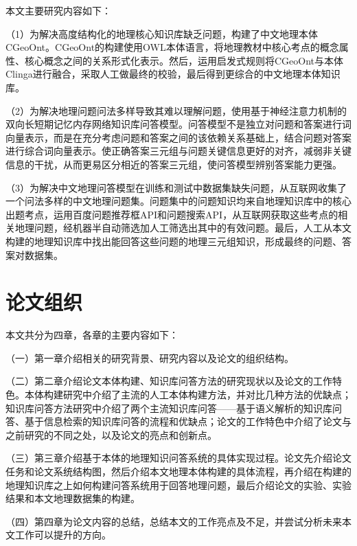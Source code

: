 本文主要研究内容如下：

（1）为解决高度结构化的地理核心知识库缺乏问题，构建了中文地理本体CGeoOnt。CGeoOnt的构建使用OWL本体语言，将地理教材中核心考点的概念属性、核心概念之间的关系形式化表示。然后，运用启发式规则将CGeoOnt与本体Clinga进行融合，采取人工做最终的校验，最后得到更综合的中文地理本体知识库。

（2）为解决地理问题问法多样导致其难以理解问题，使用基于神经注意力机制的双向长短期记忆内存网络知识库问答模型。问答模型不是独立对问题和答案进行词向量表示，而是在充分考虑问题和答案之间的该依赖关系基础上，结合问题对答案进行综合词向量表示。使正确答案三元组与问题关键信息更好的对齐，减弱非关键信息的干扰，从而更易区分相近的答案三元组，使问答模型辨别答案能力更强。

（3）为解决中文地理问答模型在训练和测试中数据集缺失问题，从互联网收集了一个问法多样的中文地理问题集。问题集中的问题知识均来自地理知识库中的核心出题考点，运用百度问题推荐框API和问题搜索API，从互联网获取这些考点的相关地理问题，经机器半自动筛选加人工筛选出其中的有效问题。最后，人工从本文构建的地理知识库中找出能回答这些问题的地理三元组知识，形成最终的问题、答案对数据集。

\section{论文组织}
本文共分为四章，各章的主要内容如下：

（一）第一章介绍相关的研究背景、研究内容以及论文的组织结构。

（二）第二章介绍论文本体构建、知识库问答方法的研究现状以及论文的工作特色。本体构建研究中介绍了主流的人工本体构建方法，并对比几种方法的优缺点；知识库问答方法研究中介绍了两个主流知识库问答——基于语义解析的知识库问答、基于信息检索的知识库问答的流程和优缺点；论文的工作特色中介绍了论文与之前研究的不同之处，以及论文的亮点和创新点。

（三）第三章介绍基于本体的地理知识问答系统的具体实现过程。论文先介绍论文任务和论文系统结构图，然后介绍本文地理本体构建的具体流程，再介绍在构建的地理知识库之上如何构建问答系统用于回答地理问题，最后介绍论文的实验、实验结果和本文地理数据集的构建。

（四）第四章为论文内容的总结，总结本文的工作亮点及不足，并尝试分析未来本文工作可以提升的方向。